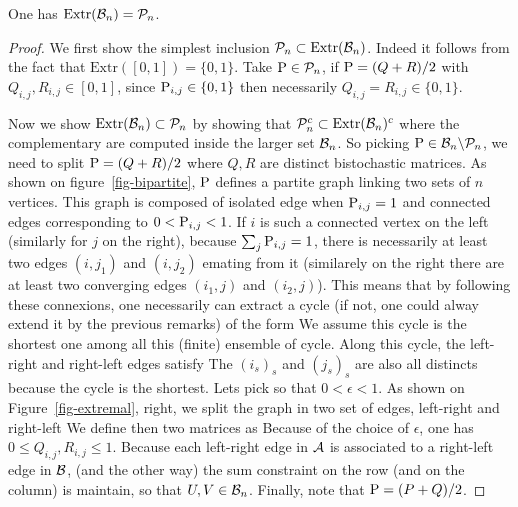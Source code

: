 \begin{thm}\label{thm-birkh-vnm}
	One has $\text{Extr}(\Bb_n) = \Pp_n$.
\end{thm}
\begin{proof}
	We first show the simplest inclusion $\Pp_n \subset \text{Extr}(\Bb_n)$. Indeed it follows from the fact that $\text{Extr}([0,1]) = \{0,1\}$. Take $\P \in \Pp_n$, if $\P=(Q+R)/2$ with $Q_{i,j},R_{i,j} \in [0,1]$, since $\P_{i,j} \in \{0,1\}$ then necessarily $Q_{i,j}=R_{i,j} \in \{0,1\}$.
	
	Now we show $\text{Extr}(\Bb_n) \subset \Pp_n$ by showing that $\Pp_n^c \subset \text{Extr}(\Bb_n)^c$ where the complementary are computed inside the larger set $\Bb_n$. So picking $\P \in \Bb_n \backslash \Pp_n$, we need to split $\P = (Q+R)/2$ where $Q,R$ are distinct bistochastic matrices. 
	As shown on figure~\ref{fig-bipartite}, $\P$ defines a partite graph linking two sets of $n$ vertices. 
	This graph is composed of isolated edge when $\P_{i,j}=1$ and connected edges corresponding to $0 < \P_{i,j} <1$.
	If $i$ is such a connected vertex on the left (similarly for $j$ on the right), because $\sum_j \P_{i,j}=1$, there is necessarily at least two edges $(i,j_1)$ and $(i,j_2)$ emating from it (similarely on the right there are at least two converging edges $(i_1,j)$ and $(i_2,j)$). This means that by following these connexions, one necessarily can extract a cycle (if not, one could alway extend it by the previous remarks) of the form
	We assume this cycle is the shortest one among all this (finite) ensemble of cycle. Along this cycle, the left-right and right-left edges satisfy
	The $(i_s)_s$ and $(j_s)_s$ are also all distincts because the cycle is the shortest. Lets pick
	so that $0 < \epsilon < 1$. As shown on Figure~\ref{fig-extremal}, right, we split the graph in two set of edges, left-right and right-left
	We define then two matrices as
	Because of the choice of $\epsilon$, one has $0 \leq Q_{i,j}, R_{i,j} \leq 1$.
	Because each left-right edge in $\Aa$ is associated to a right-left edge in $\Bb$, (and the other way) the
	sum constraint on the row (and on the column) is maintain, so that $U,V \in \Bb_n$. Finally, note that $\P=(P+Q)/2$.	
\end{proof}



